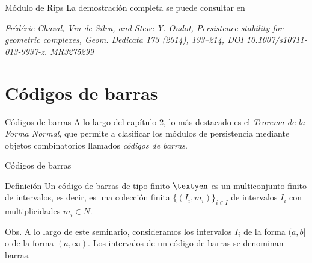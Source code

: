 \documentclass{beamer}
\begin{document}
\begin{frame}{Módulo de Rips}    
    La demostración completa se puede consultar en
    \newline
    \pause
    
    \textit{Frédéric Chazal, Vin de Silva, and Steve Y. Oudot, Persistence stability for geometric complexes, Geom. Dedicata 173 (2014), 193–214, DOI 10.1007/s10711-013-9937-z. MR3275299} 
\end{frame}

\section{Códigos de barras}
\begin{frame}{Códigos de barras}
    A lo largo del capítulo 2, lo más destacado es el \textit{Teorema de la Forma Normal}, que permite a clasificar los módulos de persistencia mediante objetos combinatorios llamados \textit{códigos de barras}.
\end{frame}

\begin{frame}{Códigos de barras}
    \begin{block}{Definición}
        Un código de barras de tipo finito $\textyen$ es un multiconjunto finito de intervalos, es decir, es una colección finita $\{(I_{i} , m_{i})\}_{i\in I}$ de intervalos $I_i$ con multiplicidades $m_i\in N$. 
    \end{block}
    \pause
    
    \begin{block}{Obs.}
    A lo largo de este seminario, consideramos los intervalos $I_i$ de la forma $(a, b]$ o de la forma $(a, \infty)$. Los intervalos de un código de barras se denominan barras.
    \end{block}
    
\end{frame}
\end{document}
